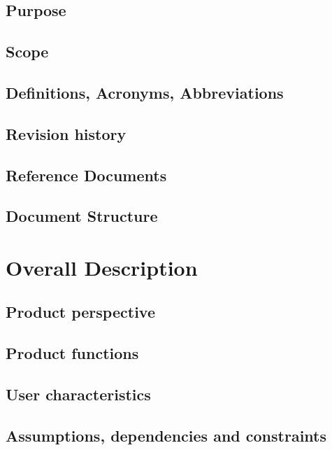 \documentclass[12pt]{report}
\begin{document}
    \section{Purpose}
        
    \section{Scope}
        
    \section{Definitions, Acronyms, Abbreviations}
    	
    \section{Revision history}
    \section{Reference Documents}
        
    \section{Document Structure}
    	
    
\newpage
\chapter{Overall Description}
    \section{Product perspective}
        
    \section{Product functions}
    	
    \section{User characteristics}
    	
    \section{Assumptions, dependencies and constraints}
    	
    
\end{document}
